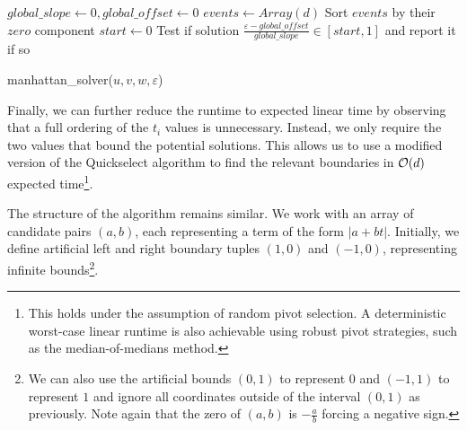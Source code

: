 \begin{algorithm}[ht]
  \DontPrintSemicolon
  \BlankLine
  \(global\_slope \gets 0, global\_offset \gets 0\) \;
  \(events \gets Array(d)\)
  Sort \(events\) by their \(zero\) component\;
  \(start \gets 0\)\;
  Test if solution \(\frac{\varepsilon - global\_offset}{global\_slope} \in [start, 1]\) and report it if so\;

  \caption{manhattan\_solver(\(u, v, w, \varepsilon\))}
  \label{algo:solve_manhattan}
\end{algorithm}

Finally, we can further reduce the runtime to expected linear time by observing that a full ordering of the \(t_i\) values is unnecessary. Instead, we only require the two values that bound the potential solutions. This allows us to use a modified version of the Quickselect algorithm to find the relevant boundaries in \(\mathcal{O}(d)\) expected time\footnote{This holds under the assumption of random pivot selection. A deterministic worst-case linear runtime is also achievable using robust pivot strategies, such as the median-of-medians method.}. 

The structure of the algorithm remains similar. We work with an array of candidate pairs \((a, b)\), each representing a term of the form \(|a+bt|\). Initially, we define artificial left and right boundary tuples \((1, 0)\) and \((-1, 0)\), representing infinite bounds\footnote{We can also use the artificial bounds \((0, 1)\) to represent \(0\) and \((-1, 1)\) to represent \(1\) and ignore all coordinates outside of the interval \((0, 1)\) as previously. Note again that the zero of \((a, b)\) is \(-\frac{a}{b}\) forcing a negative sign.}. 

